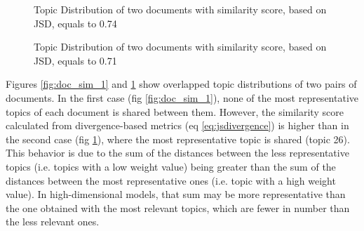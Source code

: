 \begin{figure}[!htb]\centering
   \begin{minipage}{0.49\textwidth}
     \caption{Topic Distribution of two documents with similarity score, based on JSD, equals to 0.74}\label{fig:doc_sim_1}
   \end{minipage}
   \begin {minipage}[c]{0.49\textwidth}
     \caption{Topic Distribution of two documents with similarity score, based on JSD, equals to 0.71}\label{fig:doc_sim_2}
   \end{minipage}
\end{figure}

Figures \ref{fig:doc_sim_1} and \ref{fig:doc_sim_2} show overlapped topic distributions of two pairs of documents. In the first case (fig  \ref{fig:doc_sim_1}), none of the most representative topics of each document is shared between them. However, the similarity score calculated from divergence-based metrics (eq \ref{eq:jsdivergence}) is higher than in the second case (fig  \ref{fig:doc_sim_2}), where the most representative topic is shared (topic 26). This behavior is due to the sum of the distances between the less representative topics (i.e. topics with a low weight value) being greater than the sum of the distances between the most representative ones (i.e. topic with a high weight value). In high-dimensional models, that sum may be more representative than the one obtained with the most relevant topics, which are fewer in number than the less relevant ones. 

